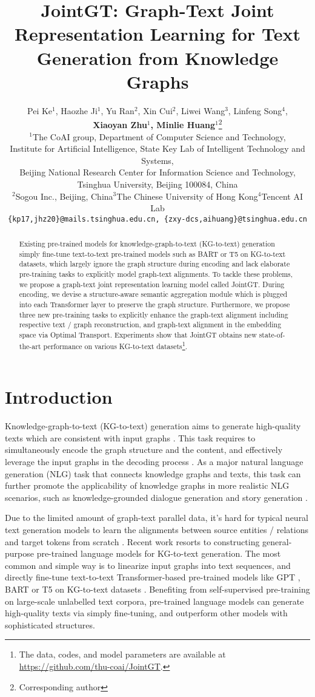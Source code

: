 \documentclass[11pt,a4paper]{article}
\title{JointGT: Graph-Text Joint Representation Learning for Text Generation from Knowledge Graphs}
\author{Pei Ke$^1$, Haozhe Ji$^1$, Yu Ran$^2$, Xin Cui$^2$, Liwei Wang$^3$, Linfeng Song$^4$, \\ \textbf{Xiaoyan Zhu}$^1$\textbf{, Minlie Huang}$^1$\thanks{\quad Corresponding author}  \\
$^1$The CoAI group, Department of Computer Science and Technology, \\
Institute for Artificial Intelligence, State Key Lab of Intelligent Technology and Systems, \\
Beijing National Research Center for Information Science and Technology, \\
Tsinghua University, Beijing 100084, China \\
$^2$Sogou Inc., Beijing, China\quad $^3$The Chinese University of Hong Kong\quad $^4$Tencent AI Lab \\
  {\tt\small \{kp17,jhz20\}@mails.tsinghua.edu.cn, \{zxy-dcs,aihuang\}@tsinghua.edu.cn} \\}
\date{}
\begin{document}
\maketitle
\begin{abstract}

Existing pre-trained models for knowledge-graph-to-text (KG-to-text) generation simply fine-tune text-to-text pre-trained models such as BART or T5 on KG-to-text datasets, which largely ignore the graph structure during encoding and lack elaborate pre-training tasks to explicitly model graph-text alignments. To tackle these problems, we propose a graph-text joint representation learning model called JointGT. During encoding, we devise a structure-aware semantic aggregation module which is plugged into each Transformer layer to preserve the graph structure. Furthermore, we propose three new pre-training tasks to explicitly enhance the graph-text alignment including respective text / graph reconstruction, and graph-text alignment in the embedding space via Optimal Transport. Experiments show that JointGT obtains new state-of-the-art performance on various KG-to-text datasets\footnote{The data, codes, and model parameters are available at \url{https://github.com/thu-coai/JointGT}.}.

\end{abstract}

\section{Introduction}

Knowledge-graph-to-text (KG-to-text) generation aims to generate high-quality texts which are consistent with input graphs \cite{gradent2017webnlg}. This task requires to simultaneously encode the graph structure and the content, and effectively leverage the input graphs in the decoding process \cite{zhao2020bridge}. As a major natural language generation (NLG) task that connects knowledge graphs and texts, this task can further promote the applicability of knowledge graphs in more realistic NLG scenarios, such as knowledge-grounded dialogue generation \cite{zhou2018ccm} and story generation \cite{guan2019seg,ji2020multihop}.

Due to the limited amount of graph-text parallel data, it's hard for typical neural text generation models to learn the alignments between source entities / relations and target tokens from scratch \cite{guo2020cyclegt,fu2020partial}. Recent work resorts to constructing general-purpose pre-trained language models for KG-to-text generation. The most common and simple way is to linearize input graphs into text sequences, and directly fine-tune text-to-text Transformer-based pre-trained models like GPT \cite{radford2018gpt,radford2019gpt2}, BART \cite{lewis2020bart} or T5 \cite{raffel2020t5} on KG-to-text datasets \cite{ribeiro2020investigate,kale2020text}. Benefiting from self-supervised pre-training on large-scale unlabelled text corpora, pre-trained language models can generate high-quality texts via simply fine-tuning, and outperform other models with sophisticated structures. 
\end{document}
